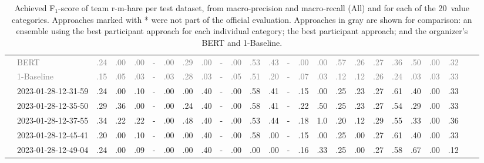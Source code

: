 \begin{table*}
\begin{tabular}{@{}ll@{\hspace{10pt}}c@{\hspace{5pt}}cccccccccccccccccccccc@{}}
& \textcolor{gray}{BERT} & \textcolor{gray}{.24} & \textcolor{gray}{.00} & \textcolor{gray}{.00} & \textcolor{gray}{-} & \textcolor{gray}{.00} & \textcolor{gray}{.29} & \textcolor{gray}{.00} & \textcolor{gray}{-} & \textcolor{gray}{.00} & \textcolor{gray}{.53} & \textcolor{gray}{.43} & \textcolor{gray}{-} & \textcolor{gray}{.00} & \textcolor{gray}{.00} & \textcolor{gray}{.57} & \textcolor{gray}{.26} & \textcolor{gray}{.27} & \textcolor{gray}{.36} & \textcolor{gray}{.50} & \textcolor{gray}{.00} & \textcolor{gray}{.32} \\
& \textcolor{gray}{1-Baseline} & \textcolor{gray}{.15} & \textcolor{gray}{.05} & \textcolor{gray}{.03} & \textcolor{gray}{-} & \textcolor{gray}{.03} & \textcolor{gray}{.28} & \textcolor{gray}{.03} & \textcolor{gray}{-} & \textcolor{gray}{.05} & \textcolor{gray}{.51} & \textcolor{gray}{.20} & \textcolor{gray}{-} & \textcolor{gray}{.07} & \textcolor{gray}{.03} & \textcolor{gray}{.12} & \textcolor{gray}{.12} & \textcolor{gray}{.26} & \textcolor{gray}{.24} & \textcolor{gray}{.03} & \textcolor{gray}{.03} & \textcolor{gray}{.33} \\
& 2023-01-28-12-31-59 & .24 & .00 & .10 & - & .00 & .00 & .40 & - & .00 & .58 & .41 & - & .15 & .00 & .25 & .23 & .27 & .61 & .40 & .00 & .33 \\
& 2023-01-28-12-35-50 & .29 & .36 & .00 & - & .00 & .24 & .40 & - & .00 & .58 & .41 & - & .22 & .50 & .25 & .23 & .27 & .54 & .29 & .00 & .33 \\
& 2023-01-28-12-37-55 & .34 & .22 & .22 & - & .00 & .48 & .40 & - & .00 & .53 & .44 & - & .18 & 1.0 & .20 & .12 & .29 & .55 & .33 & .00 & .36 \\
& 2023-01-28-12-45-41 & .20 & .00 & .10 & - & .00 & .00 & .40 & - & .00 & .58 & .00 & - & .15 & .00 & .25 & .00 & .27 & .61 & .40 & .00 & .33 \\
& 2023-01-28-12-49-04 & .24 & .00 & .09 & - & .00 & .00 & .40 & - & .00 & .00 & .00 & - & .16 & .33 & .25 & .00 & .27 & .58 & .67 & .00 & .12 \\
\bottomrule
\end{tabular}
\caption{Achieved F$_1$-score of team r-m-hare per test dataset, from macro-precision and macro-recall (All) and for each of the 20~value categories. Approaches marked with * were not part of the official evaluation. Approaches in gray are shown for comparison: an ensemble using the best participant approach for each individual category; the best participant approach; and the organizer's BERT and 1-Baseline.}
\label{table-results}
\end{table*}
